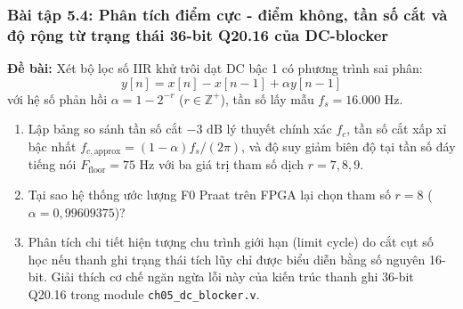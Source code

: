 \subsubsection*{Bài tập 5.4: Phân tích điểm cực - điểm không, tần số cắt và độ rộng từ trạng thái 36-bit Q20.16 của DC-blocker}
\textbf{Đề bài:} Xét bộ lọc số IIR khử trôi dạt DC bậc 1 có phương trình sai phân:
\begin{equation}
y[n] = x[n] - x[n-1] + \alpha y[n-1]
\end{equation}
với hệ số phản hồi $\alpha = 1 - 2^{-r}$ ($r \in \mathbb{Z}^+$), tần số lấy mẫu $f_s = 16.000\text{ Hz}$.
\begin{enumerate}[label=(\alph*)]
    \item Lập bảng so sánh tần số cắt $-3\text{ dB}$ lý thuyết chính xác $f_c$, tần số cắt xấp xỉ bậc nhất $f_{c,\text{approx}} = (1-\alpha)f_s/(2\pi)$, và độ suy giảm biên độ tại tần số đáy tiếng nói $F_{\text{floor}} = 75\text{ Hz}$ với ba giá trị tham số dịch $r = 7, 8, 9$.
    \item Tại sao hệ thống ước lượng F0 Praat trên FPGA lại chọn tham số $r = 8$ ($\alpha = 0{,}99609375$)?
    \item Phân tích chi tiết hiện tượng chu trình giới hạn (limit cycle) do cắt cụt số học nếu thanh ghi trạng thái tích lũy chỉ được biểu diễn bằng số nguyên 16-bit. Giải thích cơ chế ngăn ngừa lỗi này của kiến trúc thanh ghi 36-bit Q20.16 trong module \texttt{ch05\_dc\_blocker.v}.
\end{enumerate}

